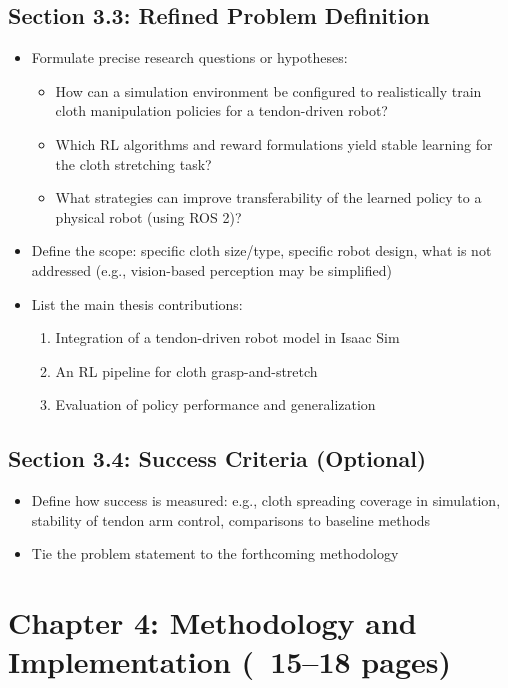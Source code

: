 \subsection{Section 3.3: Refined Problem Definition}
\begin{itemize}
    \item Formulate precise research questions or hypotheses:
    \begin{itemize}
        \item How can a simulation environment be configured to realistically train cloth manipulation policies for a tendon-driven robot?
        \item Which RL algorithms and reward formulations yield stable learning for the cloth stretching task?
        \item What strategies can improve transferability of the learned policy to a physical robot (using ROS 2)?
    \end{itemize}
    \item Define the scope: specific cloth size/type, specific robot design, what is not addressed (e.g., vision-based perception may be simplified)
    \item List the main thesis contributions:
    \begin{enumerate}
        \item Integration of a tendon-driven robot model in Isaac Sim
        \item An RL pipeline for cloth grasp-and-stretch
        \item Evaluation of policy performance and generalization
    \end{enumerate}
\end{itemize}

\subsection{Section 3.4: Success Criteria (Optional)}
\begin{itemize}
    \item Define how success is measured: e.g., cloth spreading coverage in simulation, stability of tendon arm control, comparisons to baseline methods
    \item Tie the problem statement to the forthcoming methodology
\end{itemize}

\section{Chapter 4: Methodology and Implementation (~15--18 pages)}

